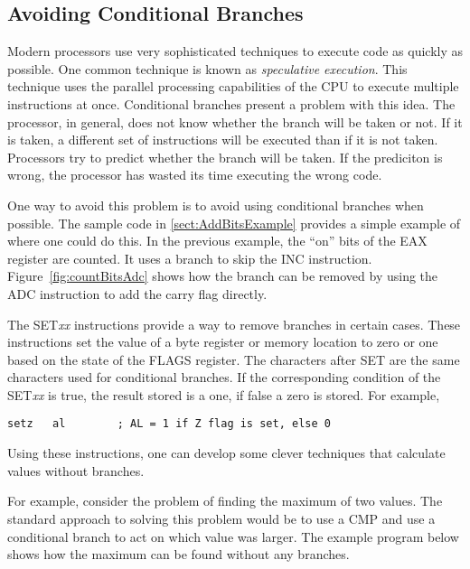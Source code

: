 \subsection{Avoiding Conditional Branches}

Modern processors use very sophisticated techniques to execute code as
quickly as possible. One common technique is known as
\emph{speculative execution}. This
technique uses the parallel processing capabilities of the CPU to
execute multiple instructions at once. Conditional branches present a
problem with this idea. The processor, in general, does not know
whether the branch will be taken or not. If it is taken, a different
set of instructions will be executed than if it is not
taken. Processors try to predict whether the branch will be taken. If
the prediciton is wrong, the processor has wasted its time executing
the wrong code.


One way to avoid this problem is to avoid using conditional branches
when possible. The sample code in \ref{sect:AddBitsExample} provides a
simple example of where one could do this. In the previous example, the
``on'' bits of the EAX register are counted. It uses a branch to skip
the {\code INC} instruction. Figure~\ref{fig:countBitsAdc} shows how
the branch can be removed by using the {\code ADC}
instruction to add the carry flag directly.

The {\code SET\emph{xx}} instructions provide a
way to remove branches in certain cases. These instructions set the
value of a byte register or memory location to zero or one based on
the state of the FLAGS register.  The characters after {\code SET} are
the same characters used for conditional branches. If the
corresponding condition of the {\code SET\emph{xx}} is true, the result stored
is a one, if false a zero is stored. For example,
\begin{lstlisting}[language={[x86masm]Assembler},numbers=none]
      setz   al        ; AL = 1 if Z flag is set, else 0
\end{lstlisting}
Using these instructions, one can develop some clever techniques that
calculate values without branches.

For example, consider the problem of finding the maximum of two values.
The standard approach to solving this problem would be to use a {\code
CMP} and use a conditional branch to act on which value was larger. The
example program below shows how the maximum can be found without any 
branches.

